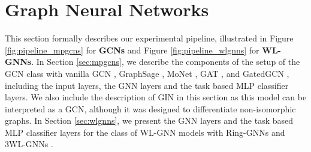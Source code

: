 \documentclass{article}
\begin{document}
\begin{table}[h]
  \begin{center}
    \caption{Summary statistics of all datasets. 
Numbers in parentheses of Node features and Edge features are the dimensions.
}
    \vspace{3pt}
    \label{tab:data_stats}
  \end{center}
\end{table}



\section{Graph Neural Networks}


This section formally describes our experimental pipeline, illustrated in Figure \ref{fig:pipeline_mpgcns} for \textbf{GCNs} and Figure \ref{fig:pipeline_wlgnns} for \textbf{WL-GNNs}. In Section \ref{sec:mpgcns}, we describe the components of the setup of the GCN class with   vanilla GCN \cite{kipf2017semi}, GraphSage \cite{hamilton2017inductive}, MoNet \cite{Monti_2017}, GAT \cite{velickovic2018graph}, and GatedGCN \cite{bresson2017residual}, 
including the input layers, the GNN layers and the task based MLP classifier layers. We also include the description of GIN \cite{xu2018how} in this section as this model can be interpreted as a GCN, although it was designed to differentiate non-isomorphic graphs.
In Section \ref{sec:wlgnns}, we present the  GNN layers and the task based MLP classifier layers for the class of WL-GNN models with Ring-GNNs \cite{chen2019equivalence} and 3WL-GNNs \cite{maron2019provably}.
\end{document}
